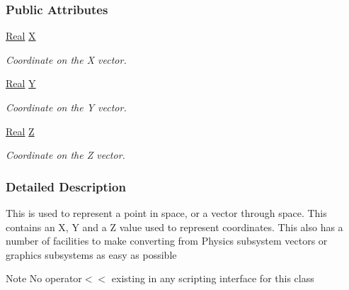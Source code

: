 \subsubsection*{Public Attributes}
\begin{DoxyCompactItemize}
\item 
\hypertarget{classMezzanine_1_1Vector3_aa858d9bc5ac5ad1b685b7088c94c05f6}{
\hyperlink{namespaceMezzanine_a726731b1a7df72bf3583e4a97282c6f6}{Real} \hyperlink{classMezzanine_1_1Vector3_aa858d9bc5ac5ad1b685b7088c94c05f6}{X}}
\label{classMezzanine_1_1Vector3_aa858d9bc5ac5ad1b685b7088c94c05f6}

\begin{DoxyCompactList}\small\item\em Coordinate on the X vector. \item\end{DoxyCompactList}\item 
\hypertarget{classMezzanine_1_1Vector3_a2303527e4ea4cd1659a23320627cd62c}{
\hyperlink{namespaceMezzanine_a726731b1a7df72bf3583e4a97282c6f6}{Real} \hyperlink{classMezzanine_1_1Vector3_a2303527e4ea4cd1659a23320627cd62c}{Y}}
\label{classMezzanine_1_1Vector3_a2303527e4ea4cd1659a23320627cd62c}

\begin{DoxyCompactList}\small\item\em Coordinate on the Y vector. \item\end{DoxyCompactList}\item 
\hypertarget{classMezzanine_1_1Vector3_a9b887faced986921956f20f3e4cb8ddc}{
\hyperlink{namespaceMezzanine_a726731b1a7df72bf3583e4a97282c6f6}{Real} \hyperlink{classMezzanine_1_1Vector3_a9b887faced986921956f20f3e4cb8ddc}{Z}}
\label{classMezzanine_1_1Vector3_a9b887faced986921956f20f3e4cb8ddc}

\begin{DoxyCompactList}\small\item\em Coordinate on the Z vector. \item\end{DoxyCompactList}\end{DoxyCompactItemize}


\subsubsection{Detailed Description}
This is used to represent a point in space, or a vector through space. This contains an X, Y and a Z value used to represent coordinates. This also has a number of facilities to make converting from Physics subsystem vectors or graphics subsystems as easy as possible \begin{DoxyNote}{Note}
No operator$<$$<$ existing in any scripting interface for this class 
\end{DoxyNote}


